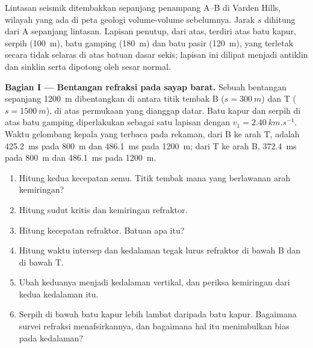 \begin{problem}
\label{pb:b3:exploration-seismology:1}
Lintasan seismik ditembakkan sepanjang penampang A--B di Varden Hills, wilayah yang ada di
peta geologi volume-volume sebelumnya. Jarak $s$ dihitung dari
A sepanjang lintasan. Lapisan penutup, dari atas, terdiri atas batu kapur, serpih (\qty{100}{m}),
batu gamping (\qty{180}{m}) dan batu pasir (\qty{120}{m}), yang terletak secara tidak selaras di atas
batuan dasar sekis; lapisan ini dilipat menjadi antiklin dan sinklin serta dipotong oleh
sesar normal.

\medskip
\noindent\textbf{Bagian I --- Bentangan refraksi pada sayap barat.} Sebuah bentangan
sepanjang \qty{1200}{m} dibentangkan di antara titik tembak B ($s = \qty{300}{m}$) dan T
($s = \qty{1500}{m}$), di atas permukaan yang dianggap datar. Batu kapur dan serpih di atas
batu gamping diperlakukan sebagai satu lapisan dengan $v_1 = \qty{2.40}{km.s^{-1}}$. Waktu
gelombang kepala yang terbaca pada rekaman, dari B ke arah T, adalah \qty{425.2}{ms} pada
\qty{800}{m} dan \qty{486.1}{ms} pada \qty{1200}{m}; dari T ke arah B,
\qty{372.4}{ms} pada \qty{800}{m} dan \qty{486.1}{ms} pada \qty{1200}{m}.
\begin{enumerate}
  \item Hitung kedua kecepatan semu. Titik tembak mana yang berlawanan arah kemiringan?
  \item Hitung sudut kritis dan kemiringan refraktor.
  \item Hitung kecepatan refraktor. Batuan apa itu?
  \item Hitung waktu intersep dan kedalaman tegak lurus
        refraktor di bawah B dan di bawah T.
  \item Ubah keduanya menjadi kedalaman vertikal, dan periksa kemiringan dari kedua kedalaman itu.
  \item Serpih di bawah batu kapur lebih lambat daripada batu kapur. Bagaimana survei
        refraksi menafsirkannya, dan bagaimana hal itu menimbulkan bias pada kedalaman?
\end{enumerate}


\end{problem}
